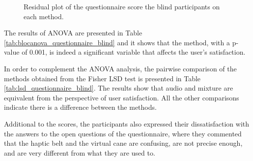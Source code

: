 \begin{figure}[!thb]
\begin{minipage}{0.45\textwidth}
        \caption{Residual plot of the questionnaire score the blind participants on each method.}
        \label{fig:residplot_questionnaire_blind}
    \end{minipage}
\end{figure}

The results of ANOVA are presented in Table  \ref{tab:blocanova_questionnaire_blind} and it shows that the method, with a p-value of 0.001, is indeed a significant variable that affects the user's satisfaction.



In order to complement the ANOVA analysis, the pairwise comparison of the methods obtained from the Fisher LSD test is presented in Table \ref{tab:lsd_questionnaire_blind}. The results show that audio and mixture are equivalent from the perspective of user satisfaction. All the other comparisons indicate there is a difference between the methods.



Additional to the scores, the participants also expressed their dissatisfaction with the answers to the open questions of the questionnaire, where they commented that the haptic belt and the virtual cane are confusing, are not precise enough, and are very different from what they are used to.

\FloatBarrier